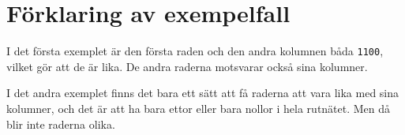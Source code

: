 \section*{Förklaring av exempelfall}

I det första exemplet är den första raden och den andra kolumnen båda \texttt{1100}, vilket gör att de 
är lika. De andra raderna motsvarar också sina kolumner.

I det andra exemplet finns det bara ett sätt att få raderna att vara lika med sina kolumner, och det är att ha 
bara ettor eller bara nollor i hela rutnätet. Men då blir inte raderna olika.

